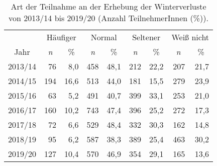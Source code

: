 \begin{table}[H]
    \centering
    \caption{Art der Teilnahme an der Erhebung der Winterverluste von 2013/14 bis 2019/20 (Anzahl TeilnehmerInnen (\%)).}
    \label{tab:u:queenproblems}
    \begin{tabular}{c|*{3}{rr|}*{2}{r}}
            \multicolumn{1}{c}{} & 
            \multicolumn{2}{c|}{Häufiger} & 
            \multicolumn{2}{c|}{Normal} & 
            \multicolumn{2}{c|}{Seltener} &
            \multicolumn{2}{c}{Weiß nicht}
            \\
        \cline{2-9}
            \multicolumn{1}{c}{Jahr} & 
            \multicolumn{1}{c}{\textit{n}} & 
            \multicolumn{1}{c|}{\%} & 
            \multicolumn{1}{c}{\textit{n}} & 
            \multicolumn{1}{c|}{\%} & 
            \multicolumn{1}{c}{\textit{n}} & 
            \multicolumn{1}{c|}{\%} &
            \multicolumn{1}{c}{\textit{n}} & 
            \multicolumn{1}{c}{\%} \\
        \hline
     2013/14 &  76 &  8,0 & 458 & 48,1 & 212 & 22,2 & 207 & 21,7 \\
     2014/15 & 194 & 16,6 & 513 & 44,0 & 181 & 15,5 & 279 & 23,9 \\
     2015/16 &  63 &  5,2 & 491 & 40,7 & 399 & 33,1 & 253 & 21,0 \\
     2016/17 & 160 & 10,2 & 743 & 47,4 & 396 & 25,2 & 272 & 17,3 \\
     2017/18 &  72 &  6,6 & 529 & 48,4 & 332 & 30,3 & 162 & 14,8 \\
     2018/19 &  95 &  6,2 & 587 & 38,3 & 389 & 25,4 & 463 & 30,2 \\
     2019/20 & 127 & 10,4 & 570 & 46,9 & 354 & 29,1 & 165 & 13,6 \\
     \hline
    \end{tabular}
\end{table}